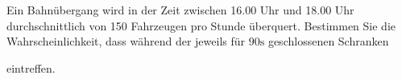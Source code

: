 \documentclass{abgabe}
\begin{document}
\begin{questions}
    \question
    Ein Bahnübergang wird in der Zeit zwischen 16.00 Uhr und 18.00 Uhr durchschnittlich von 150 Fahrzeugen pro Stunde überquert. 
    Bestimmen Sie die Wahrscheinlichkeit, dass während der jeweils für $90\si{\s}$ geschlossenen Schranken
    eintreffen.
\end{questions}
\end{document}

